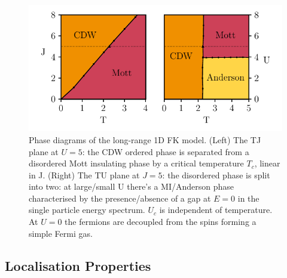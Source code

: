 \hypertarget{fig:phase_diagram}{%
\begin{figure}
\centering
\includegraphics[width=1\textwidth,height=\textheight]{figure_code/fk_chapter/phase_diagram/phase_diagram}
\caption[{Long Range Falicov Kimball Model Phase Diagram}]{Phase diagrams of the long-range 1D FK model. (Left) The TJ plane at \(U = 5\): the CDW ordered phase is separated from a disordered Mott insulating phase by a critical temperature \(T_c\), linear in J. (Right) The TU plane at \(J = 5\): the disordered phase is split into two: at large/small U there's a MI/Anderson phase characterised by the presence/absence of a gap at \(E=0\) in the single particle energy spectrum. \(U_c\) is independent of temperature. At \(U = 0\) the fermions are decoupled from the spins forming a simple Fermi gas.}
\label{fig:phase_diagram}
\end{figure}
}

\hypertarget{localisation-properties}{%
\subsection{Localisation Properties}\label{localisation-properties}}

